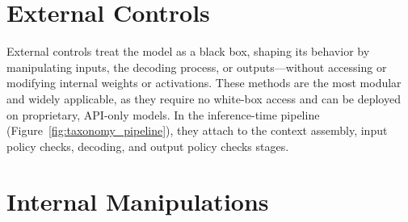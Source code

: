 \documentclass[acmsmall]{acmart}
\newcommand{\cmark}{\textcolor{green!50!black}{\ding{51}}}
\newcommand{\xmark}{\textcolor{red!70!black}{\ding{55}}}
\begin{document}



\section{External Controls}
\label{sec:external_controls}
External controls treat the model as a black box, shaping its behavior by manipulating inputs, the decoding process, or outputs---without accessing or modifying internal weights or activations. These methods are the most modular and widely applicable, as they require no white-box access and can be deployed on proprietary, API-only models. In the inference-time pipeline (Figure~\ref{fig:taxonomy_pipeline}), they attach to the context assembly, input policy checks, decoding, and output policy checks stages.





\section{Internal Manipulations}
\end{document}
